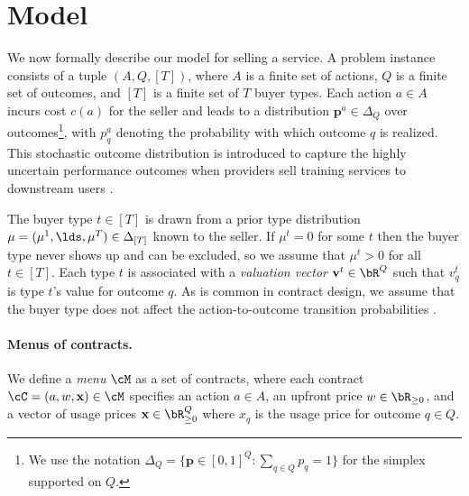 \section{Model} \label{model}

We now formally describe our model for selling a service. A problem instance consists of a tuple $(A, Q, [T])$, where $A$ is a finite set of actions, $Q$ is a finite set of outcomes, and $[T]$ is a finite set of $T$ buyer types. Each action $a\in A$ incurs cost $c(a)$ for the seller and leads to a distribution $\mathbf{p}^a \in \Delta_Q$ over outcomes\footnote{We use the notation $\Delta_Q= \{ \mathbf{p} \in [0,1]^Q: \sum_{q\in Q} p_q = 1 \}$ for the simplex supported on $Q$.}, with $p^a_q$ denoting the probability with which outcome $q$ is realized. This stochastic outcome distribution is introduced to capture the highly uncertain performance outcomes when providers sell training services to downstream users \citep{sun2023automl}.

The buyer type $t \in [T]$ is drawn from a prior type distribution $\mu = (\mu^1,\lds,\mu^T) \in \Delta_{[T]}$ known to the seller. If $\mu^t = 0$ for some $t$ then the buyer type never shows up and can be excluded, so we assume that $\mu^t > 0$ for all $t\in [T]$. Each type $t$ is associated with a \emph{valuation vector} $\mathbf{v}^t \in \bR^Q$ such that $v^t_q$ is type $t$'s value for outcome $q$. As is common in contract design, we assume that the buyer type does not affect the action-to-outcome transition probabilities \citep{dutting2024algorithmic, guruganesh2021contracts, guruganesh2023menus, zuo2024new}.


\paragraph{Menus of contracts.}

We define a \emph{menu} $\cM$ as a set of contracts, where each contract $\cC = (a, w, \mathbf{x}) \in \cM$ specifies an action $a \in A$, an upfront price $w \in \bR_{\ge 0}$, and a vector of usage prices $\mathbf{x} \in \bR^Q_{\geq 0}$ where $x_q$ is the usage price for outcome $q \in Q$.


